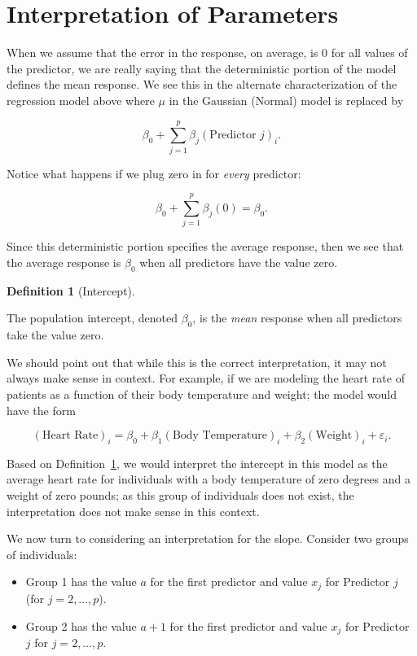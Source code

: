 \documentclass[
  letterpaper,
  DIV=11,
  numbers=noendperiod]{scrreprt}
\providecommand{\tightlist}{%
  \setlength{\itemsep}{0pt}\setlength{\parskip}{0pt}}\usepackage{longtable,booktabs,array}
\theoremstyle{definition}
\theoremstyle{definition}
\newtheorem{definition}{Definition}[chapter]
\theoremstyle{remark}
\begin{document}
\hypertarget{interpretation-of-parameters}{%
\section{Interpretation of
Parameters}\label{interpretation-of-parameters}}

When we assume that the error in the response, on average, is 0 for all
values of the predictor, we are really saying that the deterministic
portion of the model defines the mean response. We see this in the
alternate characterization of the regression model above where \(\mu\)
in the Gaussian (Normal) model is replaced by

\[\beta_0 + \sum_{j=1}^{p} \beta_j (\text{Predictor } j)_i.\]

Notice what happens if we plug zero in for \emph{every} predictor:

\[\beta_0 + \sum_{j=1}^{p} \beta_j (0) = \beta_0.\]

Since this deterministic portion specifies the average response, then we
see that the average response is \(\beta_0\) when all predictors have
the value zero.

\begin{definition}[Intercept]\protect\hypertarget{def-intercept}{}\label{def-intercept}

The population intercept, denoted \(\beta_0\), is the \emph{mean}
response when all predictors take the value zero.

\end{definition}

We should point out that while this is the correct interpretation, it
may not always make sense in context. For example, if we are modeling
the heart rate of patients as a function of their body temperature and
weight; the model would have the form

\[(\text{Heart Rate})_i = \beta_0 + \beta_1 (\text{Body Temperature})_i + \beta_2 (\text{Weight})_i + \varepsilon_i.\]

Based on Definition~\ref{def-intercept}, we would interpret the
intercept in this model as the average heart rate for individuals with a
body temperature of zero degrees and a weight of zero pounds; as this
group of individuals does not exist, the interpretation does not make
sense in this context.

We now turn to considering an interpretation for the slope. Consider two
groups of individuals:

\begin{itemize}
\tightlist
\item
  Group 1 has the value \(a\) for the first predictor and value \(x_j\)
  for Predictor \(j\) (for \(j = 2, \dotsc, p\)).
\item
  Group 2 has the value \(a + 1\) for the first predictor and value
  \(x_j\) for Predictor \(j\) for \(j = 2, \dotsc, p\).
\end{itemize}
\end{document}
